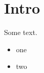 \documentclass{article}
\begin{document}
	\section{Intro}
	Some text.
	\begin{itemize}
		\item one
		\item two
	\end{itemize}
\end{document}
